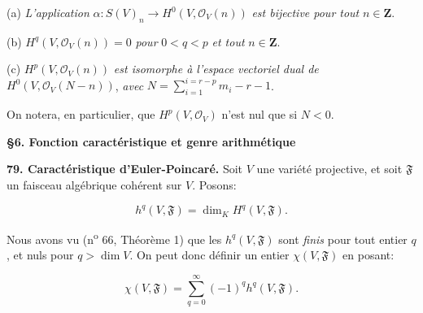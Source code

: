 %
%
%
%
(a) \textit{L'application} $\alpha: S(V)_n \rightarrow H^0(V, \mathcal{O}_V(n))$ \textit{est bijective pour tout} $n \in \mathbf{Z}$.

(b) $H^q(V, \mathcal{O}_V(n)) = 0$ \textit{pour} $0 < q < p$ \textit{et tout} $n \in \mathbf{Z}$.

(c) $H^p(V, \mathcal{O}_V(n))$ \textit{est isomorphe à l'espace vectoriel dual de} $H^0(V, \mathcal{O}_V(N - n))$, \textit{avec} $N = \sum_{i=1}^{i=r-p} m_i - r - 1$.

On notera, en particulier, que $H^p(V, \mathcal{O}_V)$ n'est nul que si $N < 0$.

\begin{center}
\textbf{\S6. Fonction caractéristique et genre arithmétique}
\end{center}

\textbf{79. Caractéristique d'Euler-Poincaré.} Soit $V$ une variété projective, et soit $\mathfrak{F}$ un faisceau algébrique cohérent sur $V$. Posons:

\begin{equation*}
h^q(V, \mathfrak{F}) = \dim_K H^q(V, \mathfrak{F}).
\end{equation*}

Nous avons vu (n\textsuperscript{o} 66, Théorème 1) que les $h^q(V, \mathfrak{F})$ sont \textit{finis} pour tout entier $q$, et nuls pour $q > \dim V$. On peut donc définir un entier $\chi(V, \mathfrak{F})$ en posant:

\begin{equation*}
\chi(V, \mathfrak{F}) = \sum_{q=0}^{\infty} (-1)^q h^q(V, \mathfrak{F}).
\end{equation*}


